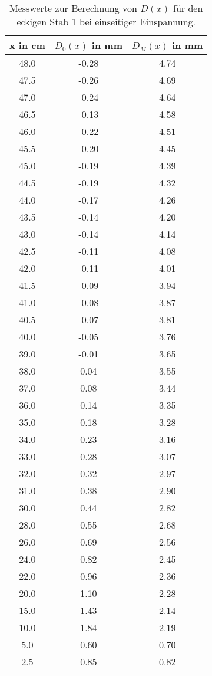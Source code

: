 \begin{table}
  \centering
  \begin{tabular}{c c c}
    \toprule
    x in \si{\centi\meter} & $D_0(x)$ in \si{\milli\meter} & $D_M(x)$ in \si{\milli\meter} \\
    \midrule
    48.0	&	-0.28	&	4.74 \\
    47.5	&	-0.26	&	4.69 \\
    47.0	&	-0.24	&	4.64 \\
    46.5	&	-0.13	&	4.58 \\
    46.0	&	-0.22	&	4.51 \\
    45.5	&	-0.20	&	4.45 \\
    45.0	&	-0.19	&	4.39 \\
    44.5	&	-0.19	&	4.32 \\
    44.0	&	-0.17	&	4.26 \\
    43.5	&	-0.14	&	4.20 \\
    43.0	&	-0.14	&	4.14 \\
    42.5	&	-0.11	&	4.08 \\
    42.0	&	-0.11	&	4.01 \\
    41.5	&	-0.09	&	3.94 \\
    41.0	&	-0.08	&	3.87 \\
    40.5	&	-0.07	&	3.81 \\
    40.0	&	-0.05	&	3.76 \\
    39.0	&	-0.01	&	3.65 \\
    38.0	&	0.04	&	3.55 \\
    37.0	&	0.08	&	3.44 \\
    36.0	&	0.14	&	3.35 \\
    35.0	&	0.18	&	3.28 \\
    34.0	&	0.23	&	3.16 \\
    33.0	&	0.28	&	3.07 \\
    32.0	&	0.32	&	2.97 \\
    31.0	&	0.38	&	2.90 \\
    30.0	&	0.44	&	2.82 \\
    28.0	&	0.55	&	2.68 \\
    26.0	&	0.69	&	2.56 \\
    24.0	&	0.82	&	2.45 \\
    22.0	&	0.96	&	2.36 \\
    20.0	&	1.10	&	2.28 \\
    15.0	&	1.43	&	2.14 \\
    10.0	&	1.84	&	2.19 \\
     5.0	&	0.60	&	0.70 \\
     2.5	&	0.85	&	0.82 \\
    \bottomrule
  \end{tabular}
  \caption{Messwerte zur Berechnung von $D(x)$ für den eckigen Stab 1 bei einseitiger
  Einspannung.}
  \label{tab:messung1}
\end{table}



